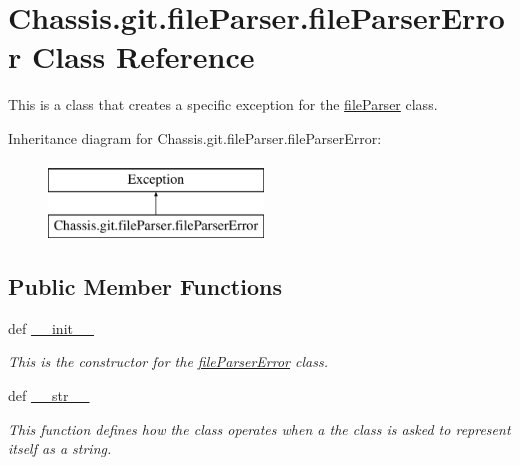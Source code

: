 \hypertarget{class_chassis_8git_1_1file_parser_1_1file_parser_error}{\section{Chassis.\-git.\-file\-Parser.\-file\-Parser\-Error Class Reference}
\label{class_chassis_8git_1_1file_parser_1_1file_parser_error}
}


This is a class that creates a specific exception for the \hyperlink{class_chassis_8git_1_1file_parser_1_1file_parser}{file\-Parser} class.  


Inheritance diagram for Chassis.\-git.\-file\-Parser.\-file\-Parser\-Error\-:\begin{figure}[H]
\begin{center}
\leavevmode
\includegraphics[height=2.000000cm]{class_chassis_8git_1_1file_parser_1_1file_parser_error}
\end{center}
\end{figure}
\subsection*{Public Member Functions}
\begin{DoxyCompactItemize}
\item 
def \hyperlink{class_chassis_8git_1_1file_parser_1_1file_parser_error_aa173a58d701594551c846004ebcdc73e}{\-\_\-\-\_\-init\-\_\-\-\_\-}
\begin{DoxyCompactList}\small\item\em This is the constructor for the \hyperlink{class_chassis_8git_1_1file_parser_1_1file_parser_error}{file\-Parser\-Error} class. \end{DoxyCompactList}\item 
def \hyperlink{class_chassis_8git_1_1file_parser_1_1file_parser_error_a305a1e903c980fcb65b00deeb44e6776}{\-\_\-\-\_\-str\-\_\-\-\_\-}
\begin{DoxyCompactList}\small\item\em This function defines how the class operates when a the class is asked to represent itself as a string. \end{DoxyCompactList}\end{DoxyCompactItemize}
